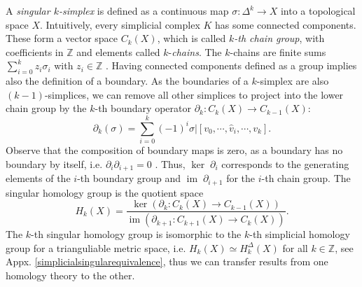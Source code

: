\documentclass[envcountsect,runningheads]{llncs}
\DeclareMathOperator{\Ima}{im}
\begin{document}
A \textit{singular $k$-simplex} is defined as a continuous map $\sigma: \Delta^k \rightarrow X$ into a topological space $X$. Intuitively, every simplicial complex $K$ has some connected components. These form a vector space $C_k(X)$, which is called \textit{$k$-th chain group}, with coefficients in $\mathbb{Z}$ and elements called $k$-\textit{chains}. The $k$-chains are finite sums $\sum_{i=0}^{k} z_i \sigma_i$ with $z_i \in \mathbb{Z}$ . Having connected components defined as a group implies also the definition of a boundary. As the boundaries of a $k$-simplex are also $(k-1)$-simplices, we can remove all other simplices to project into the lower chain group by the $k$-th boundary operator $\partial_k: C_k(X) \rightarrow C_{k-1}(X)$:
\begin{equation}
    \partial_k(\sigma) = \sum_{i=0}^{k} (-1)^{i} \sigma \bigg\vert {[v_0,\cdots,\hat{v}_i, \cdots, v_k]}.
\end{equation}
Observe that the composition of boundary maps is zero, as a boundary has no boundary by itself, i.e. $\partial_i\partial_{i+1} = 0$ . Thus, $\ker \; \partial_i$ corresponds to the generating elements of the $i$-th boundary group and $\Ima \; \partial_{i+1}$ for the $i$-th chain group. The singular homology group is the quotient space
\begin{equation}
    H_k(X) = \frac{\ker \left(\partial_k: C_k\left(X\right) \rightarrow C_{k-1}\left(X\right)\right)}{\Ima \left(\partial_{k+1}:C_{k+1}\left(X\right) \rightarrow C_{k}\left(X\right)\right)}.
\end{equation}
The $k$-th singular homology group is isomorphic to the $k$-th simplicial homology group for a trianguliable metric space, i.e. $H_k(X) \simeq H^{\Delta}_k(X)$ for all $k \in \mathbb{Z}$, see Appx. \ref{simplicialsingularequivalence}, thus we can transfer results from one homology theory to the other.
\end{document}
